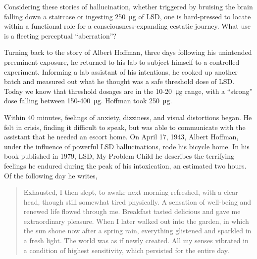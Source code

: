 \documentclass{UIdahoMastersThesis}
\begin{document}
Considering these stories of hallucination, whether triggered by bruising the brain falling down a staircase or ingesting \SI{250}{\micro\gram} of LSD, one is hard-pressed to locate within a functional role for a consciousness-expanding ecstatic journey. What use is a fleeting perceptual ``aberration''?

Turning back to the story of Albert Hoffman, three days following his unintended preeminent exposure, he returned to his lab to subject himself to a controlled experiment. Informing a lab assistant of his intentions, he cooked up another batch and measured out what he thought was a safe threshold dose of LSD. Today we know that threshold dosages are in the 10-\SI{20}{\micro\gram} range, with a ``strong'' dose falling between 150-\SI{400}{\micro\gram}. Hoffman took \SI{250}{\micro\gram}.

Within 40 minutes, feelings of anxiety, dizziness, and visual distortions began. He felt in crisis, finding it difficult to speak, but was able to communicate with the assistant that he needed an escort home. On April 17, 1943, Albert Hoffman, under the influence of powerful LSD hallucinations, rode his bicycle home. In his book published in 1979, LSD, My Problem Child he describes the terrifying feelings he endured during the peak of his intoxication, an estimated two hours. Of the following day he writes, 


\begin{quote}
{Exhausted, I then slept, to awake next morning refreshed, with a clear head, though still somewhat tired physically. A sensation of well-being and renewed life flowed through me. Breakfast tasted delicious and gave me extraordinary pleasure. When I later walked out into the garden, in which the sun shone now after a spring rain, everything glistened and sparkled in a fresh light. The world was as if newly created. All my senses vibrated in a condition of highest sensitivity, which persisted for the entire day.}\cite{hofmann_lsd:_1980}
\end{quote}
\end{document}
